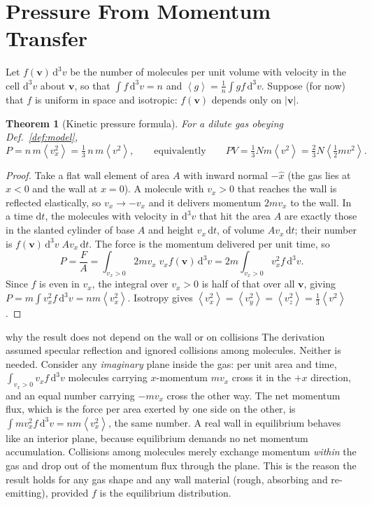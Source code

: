 \documentclass[11pt,a4paper]{report}
\theoremstyle{definition}
\theoremstyle{plain}
\newtheorem{theorem}[definition]{Theorem}
\newcommand{\dd}{\mathrm{d}}
\newcommand{\avg}[1]{\left\langle #1\right\rangle}
\newcommand{\vv}{\mathbf{v}}
\begin{document}
\section{Pressure From Momentum Transfer}
\label{sec:pressure}

Let $f(\vv)\,\dd^3v$ be the number of molecules per unit volume with velocity in the cell $\dd^3v$ about $\vv$, so that $\int f\,\dd^3v=n$ and $\avg{g}=\frac1n\int g f\,\dd^3v$. Suppose (for now) that $f$ is uniform in space and isotropic: $f(\vv)$ depends only on $|\vv|$.

\begin{theorem}[Kinetic pressure formula]\label{thm:pressure}
For a dilute gas obeying Def.~\ref{def:model},
\begin{equation}
P=n\,m\avg{v_x^2}=\tfrac13\, n\,m\avg{v^2},\qquad\text{equivalently}\qquad PV=\tfrac13 Nm\avg{v^2}=\tfrac23 N\avg{\tfrac12 mv^2}.
\label{eq:Pkinetic}
\end{equation}
\end{theorem}

\begin{proof}
Take a flat wall element of area $A$ with inward normal $-\hat x$ (the gas lies at $x<0$ and the wall at $x=0$). A molecule with $v_x>0$ that reaches the wall is reflected elastically, so $v_x\to -v_x$ and it delivers momentum $2mv_x$ to the wall. In a time $\dd t$, the molecules with velocity in $\dd^3v$ that hit the area $A$ are exactly those in the slanted cylinder of base $A$ and height $v_x\,\dd t$, of volume $A v_x\,\dd t$; their number is $f(\vv)\,\dd^3v\; A v_x\,\dd t$. The force is the momentum delivered per unit time, so
\[
P=\frac{F}{A}=\int_{v_x>0} 2m v_x\; v_x f(\vv)\,\dd^3v=2m\int_{v_x>0} v_x^2 f\,\dd^3v .
\]
Since $f$ is even in $v_x$, the integral over $v_x>0$ is half of that over all $\vv$, giving $P=m\int v_x^2 f\,\dd^3v=nm\avg{v_x^2}$. Isotropy gives $\avg{v_x^2}=\avg{v_y^2}=\avg{v_z^2}=\tfrac13\avg{v^2}$.
\end{proof}

\begin{keyidea}{why the result does not depend on the wall or on collisions}
The derivation assumed specular reflection and ignored collisions among molecules. Neither is needed. Consider any \emph{imaginary} plane inside the gas: per unit area and time, $\int_{v_x>0}v_x f\,\dd^3v$ molecules carrying $x$-momentum $mv_x$ cross it in the $+x$ direction, and an equal number carrying $-mv_x$ cross the other way. The net momentum flux, which is the force per area exerted by one side on the other, is $\int m v_x^2 f\,\dd^3v=nm\avg{v_x^2}$, the same number. A real wall in equilibrium behaves like an interior plane, because equilibrium demands no net momentum accumulation. Collisions among molecules merely exchange momentum \emph{within} the gas and drop out of the momentum flux through the plane. This is the reason the result holds for any gas shape and any wall material (rough, absorbing and re-emitting), provided $f$ is the equilibrium distribution.
\end{keyidea}
\end{document}
